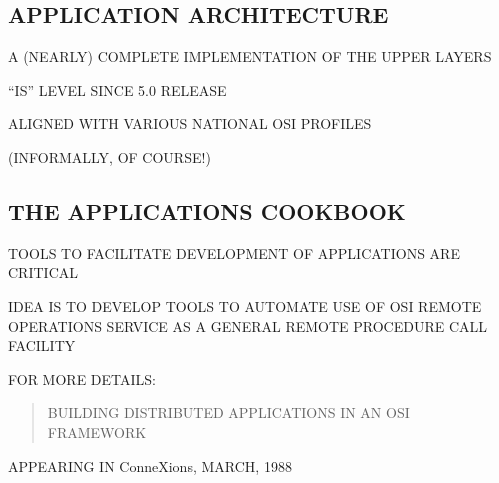 \begin{bwslide}
\part*	{APPLICATION ARCHITECTURE}\bf

\begin{nrtc}
\item	A (NEARLY) COMPLETE IMPLEMENTATION OF THE UPPER LAYERS

\item	``IS'' LEVEL SINCE 5.0 RELEASE

\item	ALIGNED WITH VARIOUS NATIONAL OSI PROFILES
    \begin{nrtc}
    \item	(INFORMALLY, OF COURSE!)
    \end{nrtc}
\end{nrtc}
\end{bwslide}








\begin{bwslide}
\part*	{THE APPLICATIONS COOKBOOK}\bf

\begin{nrtc}
\item	TOOLS TO FACILITATE DEVELOPMENT OF APPLICATIONS ARE CRITICAL

\item	IDEA IS TO DEVELOP TOOLS TO AUTOMATE USE OF OSI REMOTE OPERATIONS
	SERVICE AS A GENERAL REMOTE PROCEDURE CALL FACILITY

\item	FOR MORE DETAILS:
\begin{quote}
BUILDING DISTRIBUTED APPLICATIONS IN AN OSI FRAMEWORK
\end{quote}
APPEARING IN ConneXions, MARCH, 1988
\end{nrtc}
\end{bwslide}


